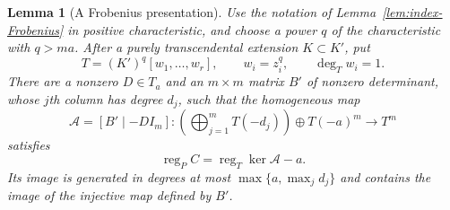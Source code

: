 \documentclass[12pt]{amsart}
\numberwithin{equation}{section}
\newtheorem{lemma}[theorem]{Lemma}
\theoremstyle{definition}
\theoremstyle{remark}
\numberwithin{equation}{section}
\DeclareMathOperator{\reg}{reg}
\begin{document}
\begin{lemma}[A Frobenius presentation]
\label{lem:frobenius-presentation}
Use the notation of Lemma~\ref{lem:index-Frobenius} in positive characteristic, and choose a power $q$ of the characteristic
with $q>ma$. After a purely transcendental extension $K\subset K'$, put
\[
 T=(K')^q[w_1,\ldots,w_r],\qquad w_i=z_i^q,
 \qquad \deg_Tw_i=1.
\]
There are a nonzero $D\in T_a$ and an $m\times m$ matrix $B'$ of nonzero determinant, whose $j$th column has degree $d_j$, such that the homogeneous map
\[
 \mathcal A=[B'\mid-DI_m]:
 \left(\bigoplus_{j=1}^mT(-d_j)\right)\oplus T(-a)^m
 \longrightarrow T^m
\]
satisfies
\begin{equation}\label{eq:frobenius-presentation-reg}
 \reg_PC=\reg_T\ker\mathcal A-a.
\end{equation}
Its image is generated in degrees at most $\max\{a,\max_jd_j\}$ and contains the image of the injective map defined by $B'$.
\end{lemma}
\end{document}
